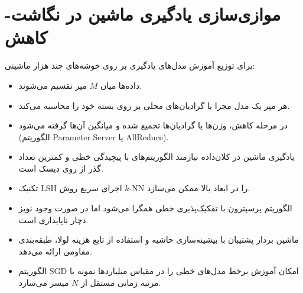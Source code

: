\section{موازی‌سازی یادگیری ماشین در نگاشت-کاهش}
برای توزیع آموزش مدل‌های یادگیری بر روی خوشه‌های چند هزار ماشینی:
\begin{itemize}
    \item داده‌ها میان $M$ مپر تقسیم می‌شوند.
    \item هر مپر یک مدل مجزا یا گرادیان‌های محلی بر روی بسته خود  را محاسبه می‌کند.
    \item در مرحله کاهش، وزن‌ها یا گرادیان‌ها تجمیع شده و میانگین آن‌ها گرفته می‌شود (الگوریتم Parameter Server یا AllReduce).
\end{itemize}

\begin{summarybox}
\begin{itemize}
    \item یادگیری ماشین در کلان‌داده نیازمند الگوریتم‌های با پیچیدگی خطی و کمترین تعداد گذر از روی دیسک است.
    \item تکنیک LSH اجرای سریع روش $k$-NN را در ابعاد بالا ممکن می‌سازد.
    \item الگوریتم پرسپترون با تفکیک‌پذیری خطی همگرا می‌شود اما در صورت وجود نویز دچار ناپایداری است.
    \item ماشین بردار پشتیبان با بیشینه‌سازی حاشیه و استفاده از تابع هزینه لولا، طبقه‌بندی مقاومی ارائه می‌دهد.
    \item الگوریتم SGD امکان آموزش برخط مدل‌های خطی را در مقیاس میلیاردها نمونه با مرتبه زمانی مستقل از $N$ میسر می‌سازد.
\end{itemize}
\end{summarybox}
